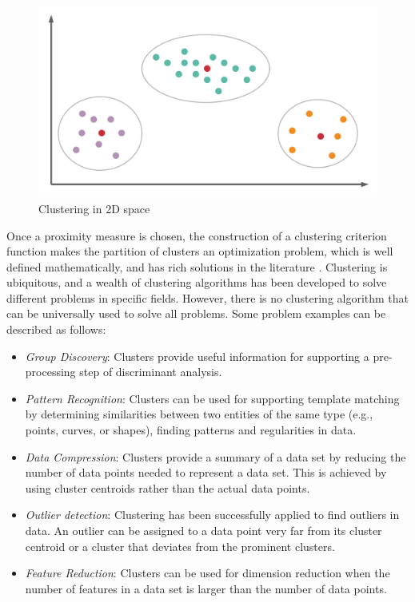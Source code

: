 \documentclass[../UNBThesis2.tex]{subfiles}
\begin{document}
\begin{figure}[!h]
    \centering
    \includegraphics[width = 8 cm]{image/Chapters/Chapter2/Blank diagram (1).png}
    \caption{Clustering in 2D space}
    \label{clus}
\end{figure}


Once a proximity measure is chosen, the construction of a clustering criterion function makes the partition of
clusters an optimization problem, which is well defined
mathematically, and has rich solutions in the literature \cite{jain1999data}. Clustering is ubiquitous, and a wealth of clustering algorithms has been developed to solve different problems in specific fields. However, there is no clustering algorithm that can be universally used to solve all problems. Some problem examples can be described as follows: 

\begin{itemize}
    \item \textit{Group Discovery}: Clusters provide useful information for supporting a pre-processing step of discriminant analysis. 
    \item \textit{Pattern Recognition}: Clusters can be used for supporting template matching by determining similarities between two entities of the same type (e.g., points, curves, or shapes), finding patterns and regularities in data.
    
    \item \textit{Data Compression}: Clusters provide a summary of a data set by reducing the number of data points needed to represent a data set. This is achieved by using cluster centroids rather than the actual data points. 
    
    \item \textit{Outlier detection}: Clustering has been successfully applied to find outliers in data. %
    An outlier can be assigned to a data point very far from its cluster centroid or a cluster that deviates from the prominent clusters.
    \item \textit{Feature Reduction}: Clusters can be used for dimension reduction when the number of features in a data set is larger than the number of data points.
    \end{itemize}
\end{document}
